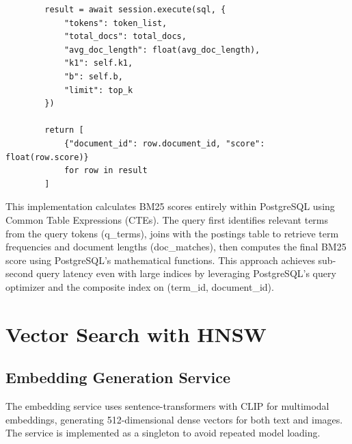 \begin{lstlisting}
        result = await session.execute(sql, {
            "tokens": token_list,
            "total_docs": total_docs,
            "avg_doc_length": float(avg_doc_length),
            "k1": self.k1,
            "b": self.b,
            "limit": top_k
        })
        
        return [
            {"document_id": row.document_id, "score": float(row.score)}
            for row in result
        ]
\end{lstlisting}

This implementation calculates BM25 scores entirely within PostgreSQL using Common Table Expressions (CTEs). The query first identifies relevant terms from the query tokens (q\_terms), joins with the postings table to retrieve term frequencies and document lengths (doc\_matches), then computes the final BM25 score using PostgreSQL's mathematical functions. This approach achieves sub-second query latency even with large indices by leveraging PostgreSQL's query optimizer and the composite index on (term\_id, document\_id).

\clearpage

\section{Vector Search with HNSW}

\subsection{Embedding Generation Service}

The embedding service uses sentence-transformers with CLIP for multimodal embeddings, generating 512-dimensional dense vectors for both text and images. The service is implemented as a singleton to avoid repeated model loading.

